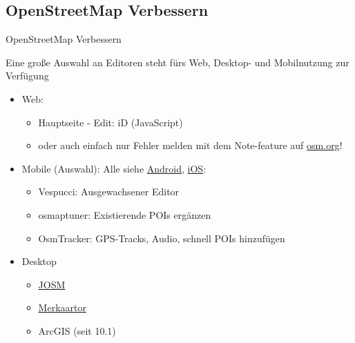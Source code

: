 \documentclass{beamer}
\begin{document}
  \subsection{ OpenStreetMap Verbessern}

\begin{frame}{OpenStreetMap Verbessern}

  Eine große Auswahl an Editoren steht fürs Web, Desktop- und Mobilnutzung zur Verfügung

  \begin{itemize}
    \item Web:
    \begin{itemize}
	    \item Hauptseite - Edit: iD (JavaScript)
      \item oder auch einfach nur Fehler melden mit dem Note-feature auf \href{http://osm.org}{osm.org}!
	      \pause
    \end{itemize}
    \item Mobile (Auswahl): Alle siehe  \href{http://wiki.openstreetmap.org/wiki/Android\#OpenStreetMap\_editing\_features}{Android}, \href{http://wiki.openstreetmap.org/wiki/Apple\_iOS\#OpenStreetMap\_editing\_features}{iOS}:
    \begin{itemize}
      \item Vespucci: Ausgewachsener Editor
      \item osmaptuner: Existierende POIs ergänzen
      \item OsmTracker: GPS-Tracks, Audio, schnell POIs hinzufügen
    \end{itemize}
  \item Desktop
    \begin{itemize}
      \item \href{http://josm.openstreetmap.de}{JOSM}
      \item \href{http://merkaartor.be}{Merkaartor}
      \item ArcGIS (seit 10.1)
    \end{itemize}
  \end{itemize}

\end{frame}
\end{document}
